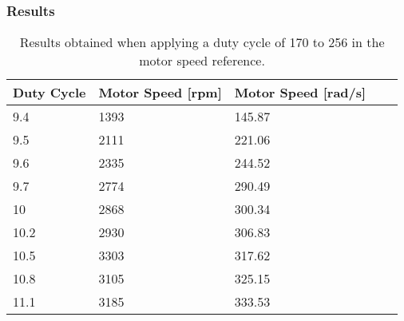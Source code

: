 \subsubsection{Results}
\begin{table}[H]
	\centering
	\begin{tabular}{|l|l|l|l|p{4.3cm}|}
		\hline%
		\textbf{Duty Cycle}    & \textbf{Motor Speed [rpm]} & \textbf{Motor Speed [rad/s]} \\ 
		\hline%
		9.4                & 1393         	   &  145.87                                       \\
		\hline%
		 9.5      &  2111 						       &  221.06				                \\
		\hline%
		 9.6       &  2335                               &  244.52   			                  \\
		\hline%
		9.7    & 2774                               &  290.49  			                       \\
		\hline%
		10   &    2868                               &  300.34                                 \\
		\hline%
		10.2   &  2930 						       &  306.83				                   \\
		\hline%
		10.5 &  3303                               &  317.62    			                    \\
		\hline%
		 10.8   &    3105                               &  325.15                               \\
		\hline%
		11.1     &  3185 						       &  333.53				                \\
		\hline%
	\end{tabular}
	\caption{Results obtained when applying a duty cycle of 170 to 256 in the motor speed reference.}
\end{table}


